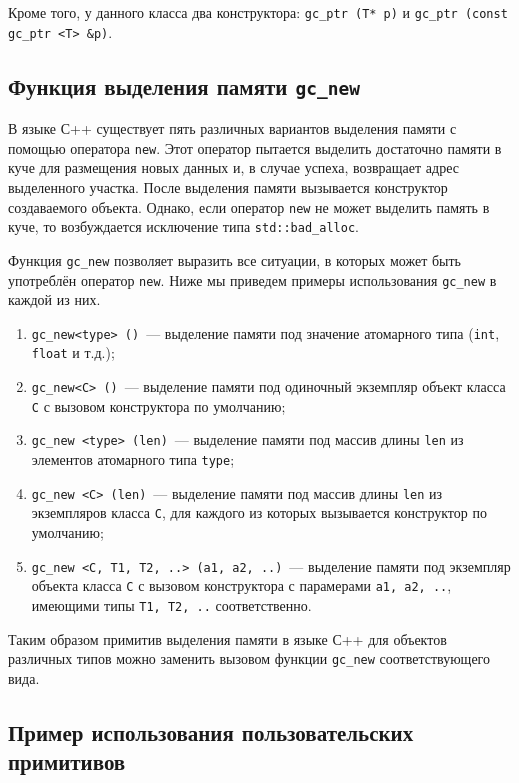 Кроме того, у данного класса два конструктора: \lstinline{gc_ptr (T* p)} и \lstinline{gc_ptr (const gc_ptr <T> &p)}. 

\subsection{Функция выделения памяти \lstinline{gc_new}}

В языке С++ существует пять различных вариантов выделения памяти с помощью оператора \lstinline{new}. 
Этот оператор пытается выделить достаточно памяти в куче для размещения новых данных и, в случае успеха, возвращает 
адрес выделенного участка. После выделения памяти вызывается конструктор создаваемого объекта. Однако, если оператор
\lstinline{new} не может выделить память в куче, то возбуждается исключение типа \lstinline{std::bad_alloc}. 

Функция \lstinline{gc_new} позволяет выразить все ситуации, в которых может быть употреблён оператор \lstinline{new}.
Ниже мы приведем примеры использования \lstinline{gc_new} в каждой из них.

\begin {enumerate}
\item \lstinline{gc_new<type> ()}~--- выделение памяти под значение атомарного типа (\lstinline{int}, \lstinline{float} и т.д.); 
\item \lstinline{gc_new<C> ()}~--- выделение памяти под одиночный экземпляр объект класса \lstinline{C} с вызовом конструктора по
умолчанию;
\item \lstinline{gc_new <type> (len)}~--- выделение памяти под массив длины \lstinline{len} из элементов атомарного типа \lstinline{type};
\item \lstinline{gc_new <C> (len)}~--- выделение памяти под массив длины \lstinline{len} из экземпляров класса \lstinline{C}, для каждого из
которых вызывается конструктор по умолчанию;
\item \lstinline{gc_new <C, T1, T2, ..> (a1, a2, ..)}~--- выделение памяти под экземпляр объекта класса \lstinline{C} с вызовом
конструктора с парамерами \lstinline{a1, a2, ..}, имеющими типы \lstinline{T1, T2, ..} соответственно.
\end {enumerate}

Таким образом примитив выделения памяти в языке С++ для объектов различных типов можно заменить вызовом функции \lstinline{gc_new} 
соответствующего вида.

\subsection{Пример использования пользовательских примитивов}

